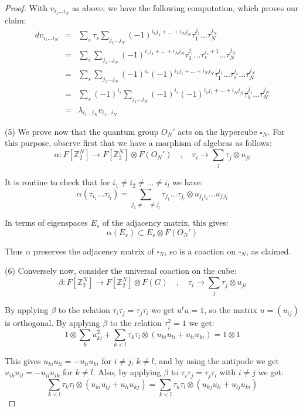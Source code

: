 \documentclass[12pt]{amsbook}
\begin{document}
\begin{proof}
With $v_{i_1\ldots i_N}$ as above, we have the following computation, which proves our claim:
\begin{eqnarray*}
dv_{i_1\ldots i_N}
&=&\sum_s\tau_s\sum_{j_1\ldots j_N}(-1)^{i_1j_1+\ldots+i_Nj_N}\tau_1^{j_1}\ldots\tau_N^{j_N}\\
&=&\sum_s\sum_{j_1\ldots j_N}(-1)^{i_1j_1+\ldots+i_Nj_N}\tau_1^{j_1}\ldots\tau_s^{j_s+1}\ldots\tau_N^{j_N}\\
&=&\sum_s\sum_{j_1\ldots j_N}(-1)^{i_s}(-1)^{i_1j_1+\ldots+i_Nj_N}\tau_1^{j_1}\ldots\tau_s^{j_s}\ldots\tau_N^{j_N}\\
&=&\sum_s(-1)^{i_s}\sum_{j_1\ldots j_N}(-1)^{i_s}(-1)^{i_1j_1+\ldots+i_Nj_N}\tau_1^{j_1}\ldots\tau_N^{j_N}\\
&=&\lambda_{i_1\ldots i_N}v_{i_1\ldots i_N}
\end{eqnarray*}

(5) We prove now that the quantum group $O_N'$ acts on the hypercube $\square_N$. For this purpose, observe first that we have a morphism of algebras as follows:
$$\alpha:F[\mathbb Z_2^N]\to F[\mathbb Z_2^N]\otimes F(O_N')
\quad,\quad\tau_i\to\sum_j\tau_j\otimes u_{ji}$$

It is routine to check that for $i_1\neq i_2\neq\ldots\neq i_l$ we have:
$$\alpha(\tau_{i_1}\ldots\tau_{i_l})=\sum_{j_1\neq\ldots\neq j_l}\tau_{j_1}\ldots\tau_{j_l} \otimes u_{j_1i_1}\ldots u_{j_li_l}$$

In terms of eigenspaces $E_s$ of the adjacency matrix, this gives:
$$\alpha(E_s)\subset E_s\otimes F(O_N')$$

Thus $\alpha$ preserves the adjacency matrix of $\square_N$, so is a coaction on $\square_N$, as claimed.

\medskip

(6) Conversely now, consider the universal coaction on the cube:
$$\beta:F[\mathbb Z_2^N]\to F[\mathbb Z_2^N]\otimes F(G)\quad,\quad\tau_i\to\sum_j\tau_j\otimes u_{ji}$$

By applying $\beta$ to the relation $\tau_i\tau_j=\tau_j\tau_i$ we get $u^tu=1$, so the matrix $u=(u_{ij})$ is orthogonal. By applying $\beta$ to the relation $\tau_i^2=1$ we get:
$$1\otimes\sum_ku_{ki}^2+\sum_{k<l}\tau_k\tau_l\otimes(u_{ki}u_{li}+u_{li}u_{ki})=1\otimes 1$$

This gives $u_{ki}u_{li}=-u_{li}u_{ki}$ for $i\neq j$, $k\neq l$, and by using the antipode we get $u_{ik}u_{il}=-u_{il}u_{ik}$ for $k\neq l$. Also, by applying $\beta$ to $\tau_i\tau_j=\tau_j\tau_i$ with $i\neq j$ we get:
$$\sum_{k<l}\tau_k\tau_l\otimes(u_{ki}u_{lj}+u_{li}u_{kj})=\sum_{k<l}\tau_k\tau_l\otimes
(u_{kj}u_{li}+u_{lj}u_{ki})$$


\end{proof}
\end{document}
